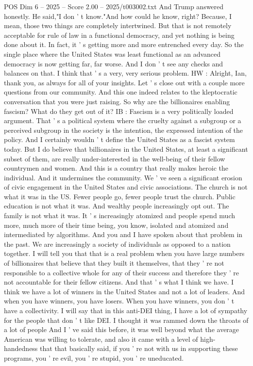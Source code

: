 \begin{textsample}{POS Dim 6 – 2025 – Score 2.00 – 2025/t003002.txt}
And Trump answered honestly.
He said,"I don ' t know."And how could he know, right?
Because, I mean, those two things are completely intertwined.
But that is not remotely acceptable for rule of law in a functional democracy, and yet nothing is being done about it.
In fact, it ' s getting more and more entrenched every day.
So the single place where the United States was least functional as an advanced democracy is now getting far, far worse.
And I don ' t see any checks and balances on that.
I think that ' s a very, very serious problem.
HW : Alright, Ian, thank you, as always for all of your insights.
Let ' s close out with a couple more questions from our community.
And this one indeed relates to the kleptocratic conversation that you were just raising.
So why are the billionaires enabling fascism?
What do they get out of it?
IB : Fascism is a very politically loaded argument.
That ' s a political system where the cruelty against a subgroup or a perceived subgroup in the society is the intention, the expressed intention of the policy.
And I certainly wouldn ' t define the United States as a fascist system today.
But I do believe that billionaires in the United States, at least a significant subset of them, are really under-interested in the well-being of their fellow countrymen and women.
And this is a country that really makes heroic the individual.
And it undermines the community.
We ' ve seen a significant erosion of civic engagement in the United States and civic associations.
The church is not what it was in the US.
Fewer people go, fewer people trust the church.
Public education is not what it was.
And wealthy people increasingly opt out.
The family is not what it was.
It ' s increasingly atomized and people spend much more, much more of their time being, you know, isolated and atomized and intermediated by algorithms.
And you and I have spoken about that problem in the past.
We are increasingly a society of individuals as opposed to a nation together.
I will tell you that that is a real problem when you have large numbers of billionaires that believe that they built it themselves, that they ' re not responsible to a collective whole for any of their success and therefore they ' re not accountable for their fellow citizens.
And that ' s what I think we have.
I think we have a lot of winners in the United States and not a lot of leaders.
And when you have winners, you have losers.
When you have winners, you don ' t have a collectivity.
I will say that in this anti-DEI thing, I have a lot of sympathy for the people that don ' t like DEI.
I thought it was rammed down the throats of a lot of people And I ' ve said this before, it was well beyond what the average American was willing to tolerate, and also it came with a level of high-handedness that that basically said, if you ' re not with us in supporting these programs, you ' re evil, you ' re stupid, you ' re uneducated.

\end{textsample}
